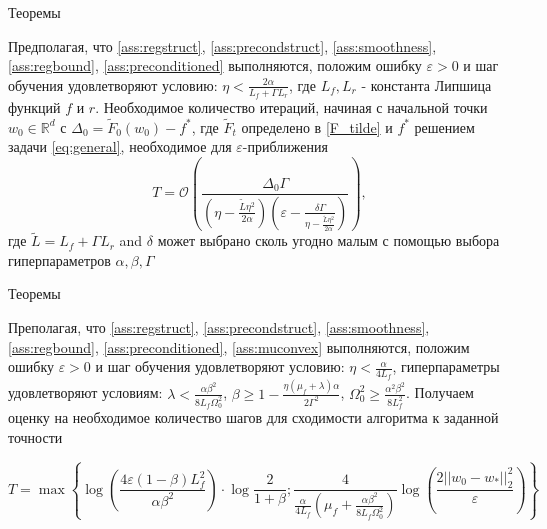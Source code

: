 \documentclass[aspectratio=169, 12pt]{beamer}
\begin{document}
\begin{frame}{Теоремы}
\begin{theorem} 
    \label{theor:1}
    Предполагая, что \ref{ass:regstruct}, \ref{ass:precondstruct}, \ref{ass:smoothness}, \ref{ass:regbound}, \ref{ass:preconditioned} выполняются, положим ошибку $\varepsilon > 0$ и шаг обучения удовлетворяют условию:
    $    \eta < \frac{2 \alpha}{L_f + \Gamma L_{r}}$,
    где $L_f, L_{r}$ - константа Липшица функций $f$ и $r$. 
    Необходимое количество итераций, начиная с начальной точки
    $w_0 \in \mathbb{R}^d$ с $\Delta_0 = \tilde{F}_0(w_0) - f^*$, где $\widetilde{F}_t$ определено в \eqref{F_tilde} и $f^*$ решением задачи \eqref{eq:general}, 
    необходимое для $\varepsilon$-приближения    
    \begin{equation*}
      T = \mathcal{O}\left( \frac{\Delta_0 \Gamma}{(\eta - \frac{\tilde{L}\eta^2}{2\alpha}) \left( \varepsilon -\frac{\delta\Gamma}{\eta - \frac{\tilde{L}\eta^2}{2\alpha}}\right)} \right),
\end{equation*}
где $\widetilde{L} = L_f + \Gamma L_{r}$ and $\delta$ может выбрано сколь угодно малым с помощью выбора гиперпараметров $\alpha, \beta, \Gamma$
\end{theorem}
\end{frame}

\begin{frame}{Теоремы}
    \begin{theorem}
\label{theor:2}
    Преполагая, что \ref{ass:regstruct}, \ref{ass:precondstruct}, \ref{ass:smoothness}, \ref{ass:regbound}, \ref{ass:preconditioned}, \ref{ass:muconvex} выполняются, положим ошибку $\varepsilon > 0$ и шаг обучения удовлетворяют условию: $\eta < \frac{\alpha}{4L_f}$, гиперпараметры удовлетворяют условиям: $\lambda < \frac{\alpha \beta^2}{8L_f \Omega_0^2}$, $\beta \geq 1 - \frac{\eta(\mu_f + \lambda)\alpha}{2 \Gamma^2}$, $\Omega_0^2 \geq \frac{\alpha^2 \beta^2}{8L_f^2}$. Получаем оценку на необходимое количество шагов для сходимости алгоритма к заданной точности

   $$
T = \max \left\{ \log{\left( \frac{4 \varepsilon (1-\beta) L_f^2 }{\alpha \beta^2} \right)} \cdot \log{\frac{2}{1+\beta}} ;
\frac{4}{\frac{\alpha}{4L_f} \left(\mu_f + \frac{\alpha \beta^2}{8L_f \Omega_0^2} \right)}\log{\left(\frac{2 ||w_0-w_*||_2^2}{\varepsilon} \right)} \right\}
$$
\end{theorem}
\end{frame}
\end{document}
